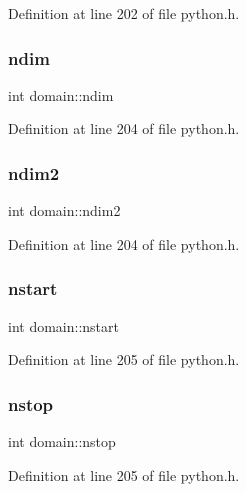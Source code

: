 Definition at line 202 of file python.\+h.

\mbox{\label{structdomain_ac90e4779abcabc0170d2bfc30a8e1323}} 
\subsubsection{\texorpdfstring{ndim}{ndim}}
{\footnotesize\ttfamily int domain\+::ndim}



Definition at line 204 of file python.\+h.

\mbox{\label{structdomain_a7d98eb17a804f4bc727325545272e3da}} 
\subsubsection{\texorpdfstring{ndim2}{ndim2}}
{\footnotesize\ttfamily int domain\+::ndim2}



Definition at line 204 of file python.\+h.

\mbox{\label{structdomain_aeddcae5f993efc8142ee84f461cfcda1}} 
\subsubsection{\texorpdfstring{nstart}{nstart}}
{\footnotesize\ttfamily int domain\+::nstart}



Definition at line 205 of file python.\+h.

\mbox{\label{structdomain_ab3733bfe4bcdd87edd4f59da33e85d46}} 
\subsubsection{\texorpdfstring{nstop}{nstop}}
{\footnotesize\ttfamily int domain\+::nstop}



Definition at line 205 of file python.\+h.

\mbox{\label{structdomain_a073d3b0cd25c68e5c3d4ea22705fd1e0}} 

